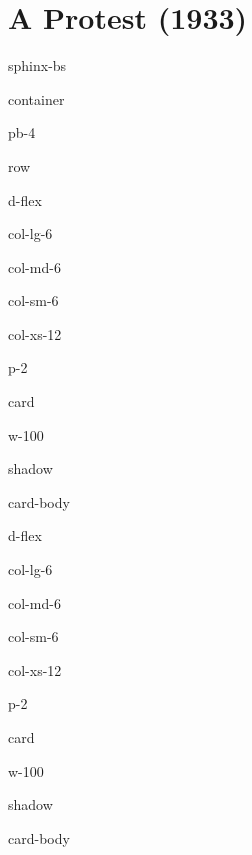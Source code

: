 \documentclass[letterpaper,10pt,english]{jupyterBook}
\begin{document}
\section{A Protest (1933)}
\label{\detokenize{Volumes/40/07/protest:a-protest-1933}}\label{\detokenize{Volumes/40/07/protest::doc}}
\begin{sphinxuseclass}{sphinx-bs}
\begin{sphinxuseclass}{container}
\begin{sphinxuseclass}{pb-4}
\begin{sphinxuseclass}{row}
\begin{sphinxuseclass}{d-flex}
\begin{sphinxuseclass}{col-lg-6}
\begin{sphinxuseclass}{col-md-6}
\begin{sphinxuseclass}{col-sm-6}
\begin{sphinxuseclass}{col-xs-12}
\begin{sphinxuseclass}{p-2}
\begin{sphinxuseclass}{card}
\begin{sphinxuseclass}{w-100}
\begin{sphinxuseclass}{shadow}
\begin{sphinxuseclass}{card-body}
\sphinxAtStartPar
{}

\end{sphinxuseclass}
\end{sphinxuseclass}
\end{sphinxuseclass}
\end{sphinxuseclass}
\end{sphinxuseclass}
\end{sphinxuseclass}
\end{sphinxuseclass}
\end{sphinxuseclass}
\end{sphinxuseclass}
\end{sphinxuseclass}
\begin{sphinxuseclass}{d-flex}
\begin{sphinxuseclass}{col-lg-6}
\begin{sphinxuseclass}{col-md-6}
\begin{sphinxuseclass}{col-sm-6}
\begin{sphinxuseclass}{col-xs-12}
\begin{sphinxuseclass}{p-2}
\begin{sphinxuseclass}{card}
\begin{sphinxuseclass}{w-100}
\begin{sphinxuseclass}{shadow}
\begin{sphinxuseclass}{card-body}
\sphinxAtStartPar
{}


\end{sphinxuseclass}
\end{sphinxuseclass}
\end{sphinxuseclass}
\end{sphinxuseclass}
\end{sphinxuseclass}
\end{sphinxuseclass}
\end{sphinxuseclass}
\end{sphinxuseclass}
\end{sphinxuseclass}
\end{sphinxuseclass}
\end{sphinxuseclass}
\end{sphinxuseclass}
\end{sphinxuseclass}
\end{sphinxuseclass}
\end{document}

